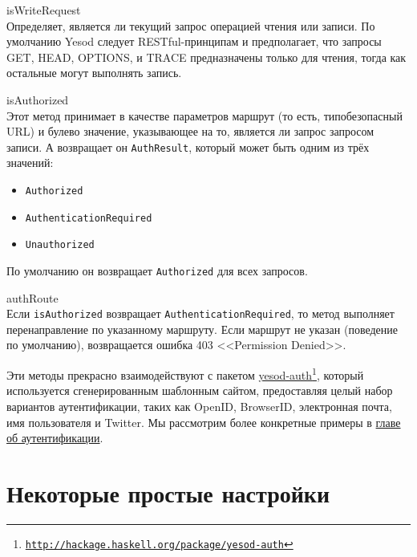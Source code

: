 \begin{description}
  \item {isWriteRequest} \hfill \\
    Определяет, является ли текущий запрос операцией чтения или записи. По
    умолчанию Yesod следует RESTful-принципам и предполагает, что запросы GET,
    HEAD, OPTIONS, и TRACE предназначены только для чтения, тогда как остальные
    могут выполнять запись.

  \item {isAuthorized} \hfill \\
    Этот метод принимает в качестве параметров маршрут (то есть, типобезопасный
    URL) и булево значение, указывающее на то, является ли запрос запросом
    записи. А возвращает он \lstinline!AuthResult!, который может быть одним из
    трёх значений:

    \begin{itemize}
      \item \lstinline!Authorized!
      \item \lstinline!AuthenticationRequired!
      \item \lstinline!Unauthorized!
    \end{itemize}

    По умолчанию он возвращает \lstinline!Authorized! для всех запросов.

  \item {authRoute} \hfill \\
    Если \lstinline!isAuthorized! возвращает
    \lstinline!AuthenticationRequired!, то метод выполняет перенаправление по
    указанному маршруту. Если маршрут не указан (поведение по умолчанию),
    возвращается ошибка 403 <<Permission Denied>>.
\end{description}

Эти методы прекрасно взаимодействуют с пакетом
\href{http://hackage.haskell.org/package/yesod-auth}{yesod-auth}\footnote{\href{http://hackage.haskell.org/package/yesod-auth}{\texttt{http://hackage.haskell.org/package/yesod-auth}}},
который используется сгенерированным шаблонным сайтом, предоставляя целый набор
вариантов аутентификации, таких как OpenID, BrowserID, электронная почта, имя
пользователя и Twitter. Мы рассмотрим более конкретные примеры в
\hyperref[chap:auth]{главе об аутентификации}.

\section {Некоторые простые настройки}

